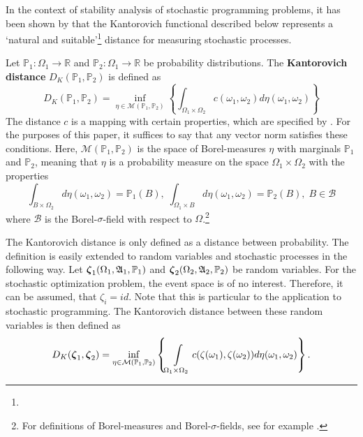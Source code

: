 In the context of stability analysis of stochastic programming problems, it has been shown by  that the Kantorovich functional described below
represents a  `natural and suitable'\footnote{} distance for measuring stochastic processes.
\begin{definition}
  Let $\mathbb{P}_1:\Omega_1\rightarrow\mathbb{R}$ and $\mathbb{P}_2:\Omega_1\rightarrow\mathbb{R}$ be probability distributions.
  The \textbf{Kantorovich distance} $D_K(\mathbb{P}_1,\mathbb{P}_2)$ is defined as
  \begin{equation}
    \label{eq:define-infinitedim-kantorovich}
    D_K(\mathbb{P}_1, \mathbb{P}_2) = \inf\limits_{\eta\in\mathcal{M}(\mathbb{P}_1,\mathbb{P}_2)}\left\{\int_{\Omega_1\times\Omega_2}c(\omega_1, \omega_2)d\eta(\omega_1,\omega_2)\right\}
  \end{equation}
  The distance $c$ is a mapping with certain properties, which are specified by .
  For the purposes of this paper, it suffices to say that any vector norm satisfies these conditions.
Here, $\mathcal{M}(\mathbb{P}_1, \mathbb{P}_2)$ is the space of Borel-measures $\eta$ with marginals $\mathbb{P}_1$ and $\mathbb{P}_2$, meaning that $\eta$ is a probability measure on the space $\Omega_1\times\Omega_2$ with the properties
\begin{equation}
  \label{eq:define-borel-measures}
  \int_{B\times \Omega_2} d\eta(\omega_1,\omega_2) = \mathbb{P}_1(B),\;   \int_{\Omega_1\times B} d\eta(\omega_1,\omega_2) = \mathbb{P}_2(B),\; B \in \mathcal{B}
\end{equation}
where $\mathcal{B}$ is the Borel-$\sigma$-field with respect to $\Omega$.\footnote{For definitions of Borel-measures and Borel-$\sigma$-fields, see for example .}
\end{definition}
The Kantorovich distance is only defined as a distance between probability.
The definition is easily extended to random variables and stochastic processes in the following way.
Let $\boldsymbol\zeta_1(\Omega_1,\mathfrak{A}_1,\mathbb{P}_1)$ and $\boldsymbol\zeta_2(\Omega_2,\mathfrak{A}_2,\mathbb{P}_2)$ be random variables.
For the stochastic optimization problem, the event space is of no interest.
Therefore, it can be assumed, that $\zeta_i = id$.
Note that this is particular to the application to stochastic programming.
The Kantorovich distance between these random variables is then defined as
\begin{equation}
  \label{eq:64}
  D_K(\boldsymbol\zeta_1,\boldsymbol\zeta_2) = \inf\limits_{\eta\in\mathcal{M}(\mathbb{P}_1,\mathbb{P}_2)}\left\{\int\limits_{\Omega_1\times\Omega_2}c(\zeta(\omega_1),\zeta(\omega_2))d\eta(\omega_1,\omega_2)\right\}.
\end{equation}

